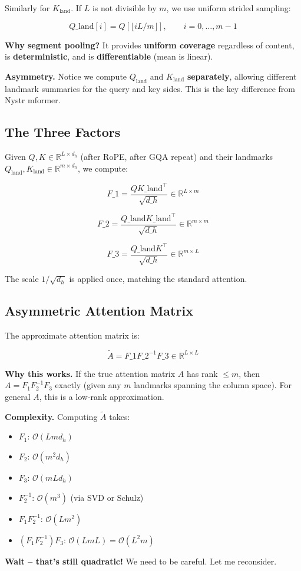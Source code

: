 Similarly for $K_\text{land}$. If $L$ is not divisible by $m$, we use 
uniform strided sampling:

\[
Q\_\text{land}[i] = Q[\lfloor i L / m \rfloor], \qquad i = 0, \ldots, m - 1
\]

\textbf{Why segment pooling?} It provides \textbf{uniform coverage} regardless of 
content, is \textbf{deterministic}, and is \textbf{differentiable} (mean is linear).

\textbf{Asymmetry.} Notice we compute $Q_\text{land}$ and $K_\text{land}$ 
\textbf{separately}, allowing different landmark summaries for the query and 
key sides. This is the key difference from Nystr mformer.

\subsection{The Three Factors}

Given $Q, K \in \mathbb{R}^{L \times d_h}$ (after RoPE, after GQA repeat) and 
their landmarks $Q_\text{land}, K_\text{land} \in \mathbb{R}^{m \times d_h}$, 
we compute:

\[
F\_1 = \frac{Q K\_\text{land}^\top}{\sqrt{d\_h}} \in \mathbb{R}^{L \times m}
\]

\[
F\_2 = \frac{Q\_\text{land} K\_\text{land}^\top}{\sqrt{d\_h}} \in \mathbb{R}^{m \times m}
\]

\[
F\_3 = \frac{Q\_\text{land} K^\top}{\sqrt{d\_h}} \in \mathbb{R}^{m \times L}
\]

The scale $1/\sqrt{d_h}$ is applied once, matching the standard attention.

\subsection{Asymmetric Attention Matrix}

The approximate attention matrix is:

\[
\tilde{A} = F\_1 F\_2^{-1} F\_3 \in \mathbb{R}^{L \times L}
\]

\textbf{Why this works.} If the true attention matrix $A$ has rank $\le m$, then 
$A = F_1 F_2^{-1} F_3$ exactly (given any $m$ landmarks spanning the column 
space). For general $A$, this is a low-rank approximation.

\textbf{Complexity.} Computing $\tilde{A}$ takes:

\begin{itemize}
\item $F_1$: $\mathcal{O}(L m d_h)$
\item $F_2$: $\mathcal{O}(m^2 d_h)$
\item $F_3$: $\mathcal{O}(m L d_h)$
\item $F_2^{-1}$: $\mathcal{O}(m^3)$ (via SVD or Schulz)
\item $F_1 F_2^{-1}$: $\mathcal{O}(L m^2)$
\item $(F_1 F_2^{-1}) F_3$: $\mathcal{O}(L m L) = \mathcal{O}(L^2 m)$

\end{itemize}
\textbf{Wait -- that's still quadratic!} We need to be careful. Let me reconsider.

